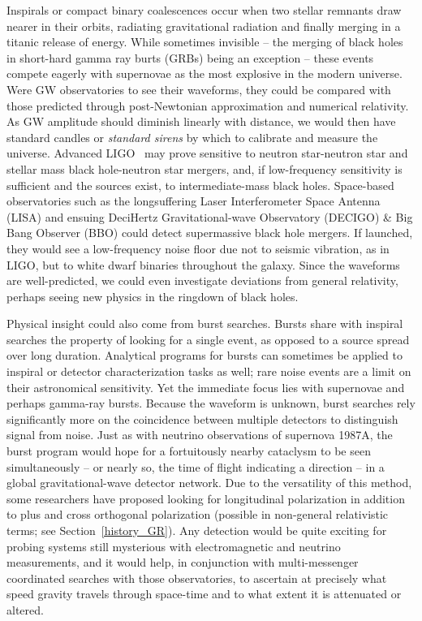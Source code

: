 Inspirals or compact binary coalescences occur when two stellar remnants draw nearer in their orbits, radiating gravitational radiation and finally merging in a titanic release of energy. 
While sometimes invisible -- the merging of black holes in short-hard gamma ray burts (GRBs) being an exception -- these events compete eagerly with supernovae as the most explosive in the modern universe. 
Were GW observatories to see their waveforms, they could be compared with those predicted through post-Newtonian approximation and numerical relativity. 
As GW amplitude should diminish linearly with distance, we would then have standard candles or \textit{standard sirens} by which to calibrate and measure the universe. 
Advanced LIGO~\cite{aLIGOrefDesign,aLIGOsysDesign} may prove sensitive to neutron star-neutron star and stellar mass black hole-neutron star mergers, and, if low-frequency sensitivity is sufficient and the sources exist, to intermediate-mass black holes. 
Space-based observatories such as the longsuffering Laser Interferometer Space Antenna (LISA) and ensuing DeciHertz Gravitational-wave Observatory (DECIGO) \& Big Bang Observer (BBO) could detect supermassive black hole mergers. If launched, they would see a low-frequency noise floor due not to seismic vibration, as in LIGO, but to white dwarf binaries throughout the galaxy. 
Since the waveforms are well-predicted, we could even investigate deviations from general relativity, perhaps seeing new physics in the ringdown of black holes.

Physical insight could also come from burst searches. 
Bursts share with inspiral searches the property of looking for a single event, as opposed to a source spread over long duration. 
Analytical programs for bursts can sometimes be applied to inspiral or detector characterization tasks as well; rare noise events are a limit on their astronomical sensitivity.
Yet the immediate focus lies with supernovae and perhaps gamma-ray bursts. 
Because the waveform is unknown, burst searches rely significantly more on the coincidence between multiple detectors to distinguish signal from noise. 
Just as with neutrino observations of supernova 1987A, the burst program would hope for a fortuitously nearby cataclysm to be seen simultaneously -- or nearly so, the time of flight indicating a direction -- in a global gravitational-wave detector network. 
Due to the versatility of this method, some researchers have proposed looking for longitudinal polarization in addition to plus and cross orthogonal polarization (possible in non-general relativistic terms; see Section~\ref{history_GR}). 
Any detection would be quite exciting for probing systems still mysterious with electromagnetic and neutrino measurements, and it would help, in conjunction with multi-messenger coordinated searches with those observatories, to ascertain at precisely what speed gravity travels through space-time and to what extent it is attenuated or altered.

